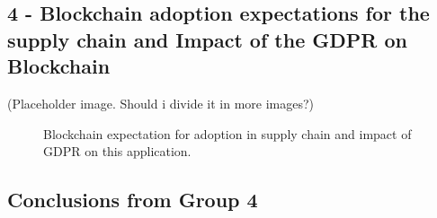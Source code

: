 
\subsection*{4 - Blockchain adoption expectations for the supply chain and Impact of the GDPR on Blockchain}
 
(Placeholder image. Should i divide it in more images?)

\begin{figure}[ht]

    
      \caption{Blockchain expectation for adoption in supply chain and impact of GDPR on this application.}
    \label{fig:group4_graphics}
\end{figure}


\subsection*{Conclusions from Group 4}